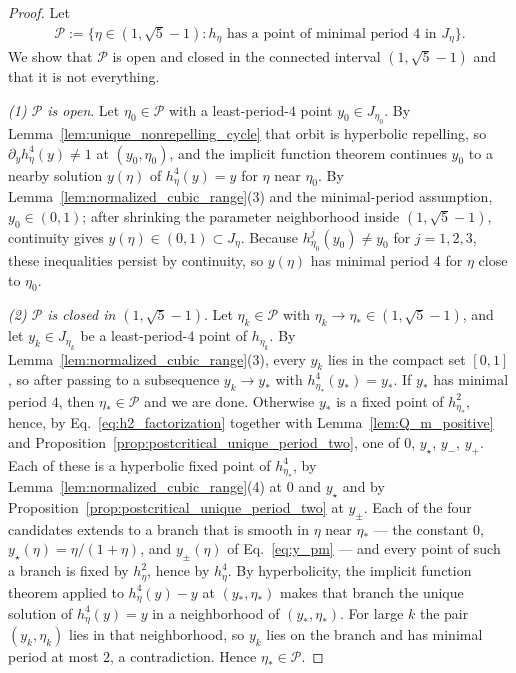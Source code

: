 \documentclass{article}
\begin{document}
\begin{proof}
Let
\begin{align}
    \mathcal P
    :=
    \bigl\{\eta\in(1,\sqrt5-1) :
    h_\eta \text{ has a point of minimal period } 4 \text{ in }J_\eta\bigr\}.
\end{align}
We show that $\mathcal P$ is open and closed in the connected interval
$(1,\sqrt5-1)$ and that it is not everything.

\emph{(1) $\mathcal P$ is open}. Let $\eta_0\in\mathcal P$ with a least-period-$4$
point $y_0\in J_{\eta_0}$. By
Lemma~\ref{lem:unique_nonrepelling_cycle} that orbit is hyperbolic repelling, so
$\partial_y h_\eta^4(y)\ne1$ at $(y_0,\eta_0)$, and the implicit
function theorem continues $y_0$ to a nearby solution
$y(\eta)$ of $h_\eta^4(y)=y$ for $\eta$ near $\eta_0$. By
Lemma~\ref{lem:normalized_cubic_range}(3) and the minimal-period assumption,
$y_0\in(0,1)$; after shrinking the parameter neighborhood inside
$(1,\sqrt5-1)$, continuity gives $y(\eta)\in(0,1)\subset J_\eta$. Because
$h_{\eta_0}^j(y_0)\ne y_0$ for $j=1,2,3$, these inequalities persist by
continuity, so $y(\eta)$ has minimal period $4$ for $\eta$ close to $\eta_0$.

\emph{(2) $\mathcal P$ is closed in $(1,\sqrt5-1)$}. Let $\eta_k\in\mathcal P$ with
$\eta_k\to\eta_\ast\in(1,\sqrt5-1)$, and let $y_k\in J_{\eta_k}$ be a
least-period-$4$ point of $h_{\eta_k}$. By
Lemma~\ref{lem:normalized_cubic_range}(3), every $y_k$ lies in the compact set
$[0,1]$, so after passing to a subsequence $y_k\to y_\ast$ with
$h_{\eta_\ast}^4(y_\ast)=y_\ast$. If $y_\ast$ has minimal period $4$, then
$\eta_\ast\in\mathcal P$ and we are done. Otherwise $y_\ast$ is a fixed point of
$h_{\eta_\ast}^2$, hence, by Eq.~\eqref{eq:h2_factorization} together with
Lemma~\ref{lem:Q_m_positive} and
Proposition~\ref{prop:postcritical_unique_period_two}, one of
$0$, $y_\star$, $y_-$, $y_+$. Each of these is a hyperbolic fixed point
of $h_{\eta_\ast}^4$, by
Lemma~\ref{lem:normalized_cubic_range}(4) at $0$ and $y_\star$ and by
Proposition~\ref{prop:postcritical_unique_period_two} at $y_\pm$.
Each of the four candidates extends to a branch that is smooth in $\eta$ near
$\eta_\ast$ --- the constant $0$, $y_\star(\eta)=\eta/(1+\eta)$, and
$y_\pm(\eta)$ of Eq.~\eqref{eq:y_pm} --- and every point of such a branch is
fixed by $h_\eta^2$, hence by $h_\eta^4$. By hyperbolicity, the implicit
function theorem applied to
$h_\eta^4(y)-y$ at $(y_\ast,\eta_\ast)$ makes that branch the unique solution of
$h_\eta^4(y)=y$ in a neighborhood of $(y_\ast,\eta_\ast)$. For large $k$ the
pair $(y_k,\eta_k)$ lies in that neighborhood, so $y_k$ lies on the branch and
has minimal period at most $2$, a contradiction. Hence $\eta_\ast\in\mathcal P$.


\end{proof}
\end{document}
